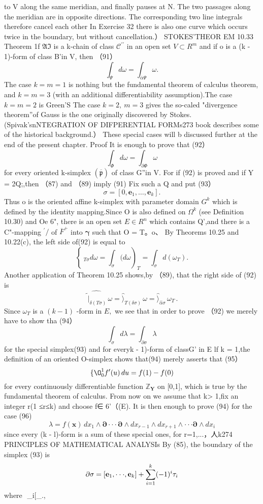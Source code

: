to V along the same meridian, and finally pauses at N. The two passages along the meridian are in opposite directions. The corresponding two line integrals therefore cancel each other In Exercise 32 there is also one curve which occurs twice in the boundary, but without cancellation.） STOKES’THEOR EM 10.33 Theorem 1f ${\mathfrak{A}}{\mathfrak{I}}$ is a k-chain of class ${\mathcal{C}}^{\prime\prime}$ in an open set $V\subset R^{m}$ and if o is a (k - 1)-form of class B’in V, then （91） $$ \int_{\Psi}d\omega=\int_{\bar{\alpha}\Psi}\omega. $$ The case $k=m=1$ is nothing but the fundamental theorem of calculus theorem, and $k=m=3$ (with an additional differentiability assumption).The case $k=m=2$ is Green'S The case $k=2,\ m=3$ gives the so-caled "divergence theorem”of Gauss is the one originally discovered by Stokes.(Spivak'snNTEGRATION OF DIFPERENTIAL FORMs273 book describes some of the historical background.） These special cases will b discussed further at the end of the present chapter. Proof It is enough to prove that (92） $$ \int_{\Phi}d\omega=\int_{\partial\Phi}\omega $$ for every oriented k-simplex $({\overline{{\mathfrak{p}}}})$ of class G”in V. For if (92) is proved and if Y = 2Q;,then （87) and （89) imply (91) Fix such a Q and put (93） $$ \sigma=[0,\mathbf{e}_{1},\dots,\mathbf{e}_{k}]. $$ Thus o is the oriented affine k-simplex with parameter domain $\textstyle{G^{k}}$ which is defined by the identity mapping.Since O is also defined on $\textstyle\Omega^{k}$ (see Definition 10.30) and Oe 6", there is an open set $E\in R^{n}$ which contains Q',and there is a C"-mapping $^{'}\!\!\!\!\!/$ of $\overline{{F}}^{+}$ into ${\boldsymbol{\gamma}}$ such that O = T。o、 By Theorems 10.25 and 10.22(c), the left side of(92) is equal to $$ \left\{\ _{T\sigma}d\omega=\int_{\sigma} (d\omega\right)_{T}=\int_{\sigma}d(\omega_{T}). $$ Another application of Theorem 10.25 shows,by （89), that the right side of (92) is $$ \hat{\tilde{\ |}_{\delta(T\sigma)}}\,\omega=\hat{\rangle}_{T(\delta\sigma)}\,\omega=\hat{\rangle}_{\hat{\alpha}\sigma}\,\omega_{T}\,. $$ Since $\omega_{T}$ is a $(k-1)$ -form in $E,$ we see that in order to prove （92) we merely have to show tha (94） $$ \int_{\sigma}d\lambda=\int_{\partial\sigma}\lambda $$ for the special simplex(93) and for everyk - 1)-form of classG’ in E lf k = 1,the definition of an oriented O-simplex shows that(94) merely asserts that (95） $$ \{\O_{0}^{1}f^{\prime}(u)\,d u=f(1)-f(0) $$ for every continuously differentiable function $\mathbb{Z}_{\mathbf{Y}}$ on [0,1], which is true by the fundamental theorem of calculus. From now on we assume that k> 1,fix an integer r(1 ≤r≤k) and choose f∈ 6'（(E). It is then enough to prove (94) for the case (96) $$ \lambda=f(\mathbf{x})\,d x_{1}\wedge\mathbf{\partial}\cdot\cdot\cdot\mathbf{\partial}\wedge d x_{r-1}\wedge d x_{r+1}\wedge\cdot\cdot\cdot\mathbf{\partial}\wedge d x_{i} $$ since every (k - l)-form is a sum of these special ones, for r=1,...，人k274 PRINCIPLES OF MATHEMATICAL ANALYSIs By (85), the boundary of the simplex (93) is $$ {\partial}\sigma=[{\bf e}_{1},\cdot\cdot\cdot,{\bf e}_{k}]+\sum_{i=1}^{k}(-1)^{i}\tau_{i} $$ where $$ {}_{i}\Longrightarrow\left[\Theta_{\right.,{}} 